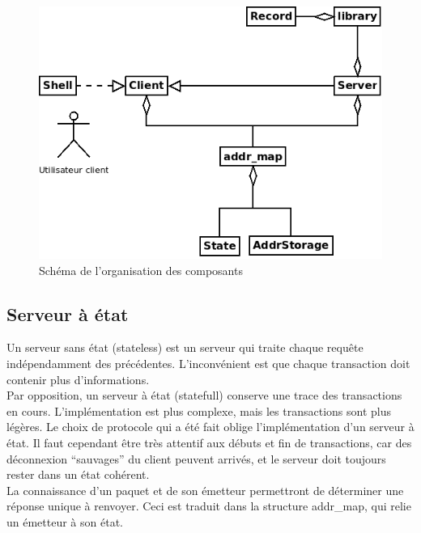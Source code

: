 \documentclass[10pt,a4paper]{article}
\begin{document}
\begin{figure}[H]
 \centering
 \includegraphics[width=12cm]{Diagramme1}
 \caption{Schéma de l'organisation des composants}
\end{figure}

\newpage
\subsection{Serveur à état} \label{sec:etat}
Un serveur sans état (stateless) est un serveur qui traite chaque requête indépendamment des précédentes. L'inconvénient est que chaque transaction doit contenir plus d'informations.\\
Par opposition, un serveur à état (statefull) conserve une trace des transactions en cours. L'implémentation est plus complexe, mais les transactions sont plus légères. Le choix de protocole qui a été fait oblige l'implémentation d'un serveur à état. Il faut cependant être très attentif aux débuts et fin de transactions, car des déconnexion ``sauvages'' du client peuvent arrivés, et le serveur doit toujours rester dans un état cohérent.\\

La connaissance d'un paquet et de son émetteur permettront de déterminer une réponse unique à renvoyer. Ceci est traduit dans la structure addr\_map, qui relie un émetteur à son état.
\end{document}

